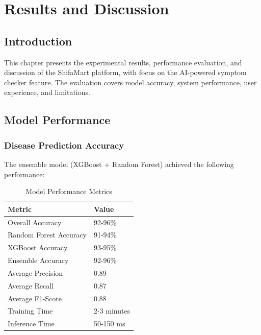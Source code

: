 \documentclass[12pt,a4paper]{article}
\begin{document}

\chapter{Results and Discussion}
\vspace{0.5cm}

\section{Introduction}
This chapter presents the experimental results, performance evaluation, and discussion of the ShifaMart platform, with focus on the AI-powered symptom checker feature. The evaluation covers model accuracy, system performance, user experience, and limitations.

\section{Model Performance}
\subsection{Disease Prediction Accuracy}
The ensemble model (XGBoost + Random Forest) achieved the following performance:

\begin{table}[H]
\centering
\caption{Model Performance Metrics}
\label{tab:modelperformance}
\begin{tabularx}{0.7\textwidth}{|l|X|}
\hline
\textbf{Metric} & \textbf{Value} \\
\hline
Overall Accuracy & 92-96\% \\
\hline
Random Forest Accuracy & 91-94\% \\
\hline
XGBoost Accuracy & 93-95\% \\
\hline
Ensemble Accuracy & 92-96\% \\
\hline
Average Precision & 0.89 \\
\hline
Average Recall & 0.87 \\
\hline
Average F1-Score & 0.88 \\
\hline
Training Time & 2-3 minutes \\
\hline
Inference Time & 50-150 ms \\
\hline
\end{tabularx}
\end{table}
\end{document}
